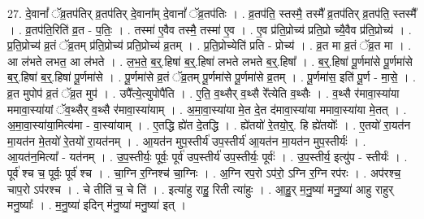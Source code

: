 \documentclass[17pt]{extarticle}
\begin{document}
27. दे॒वानां᳚ ॅव्र॒तप॑तिर् व्र॒तप॑तिर् दे॒वाना᳚म् दे॒वानां᳚ ॅव्र॒तप॑तिः । . व्र॒तप॑ति॒ स्तस्मै॒ तस्मै᳚ व्र॒तप॑तिर् व्र॒तप॑ति॒ स्तस्मै᳚ । . व्र॒तप॑ति॒रिति॑ व्र॒त - प॒तिः॒ । . तस्मा॑ ए॒वैव तस्मै॒ तस्मा॑ ए॒व । . ए॒व प्र॑ति॒प्रोच्य॑ प्रति॒प्रो च्यै॒वैव प्र॑ति॒प्रोच्य॑ । . प्र॒ति॒प्रोच्य॑ व्र॒तं ॅव्र॒तम् प्र॑ति॒प्रोच्य॑ प्रति॒प्रोच्य॑ व्र॒तम् । . प्र॒ति॒प्रोच्येति॑ प्रति - प्रोच्य॑ । . व्र॒त मा व्र॒तं ॅव्र॒त मा । . आ ल॑भते लभत॒ आ ल॑भते । . ल॒भ॒ते॒ ब॒र्॒.हिषा॑ ब॒र्॒.हिषा॑ लभते लभते ब॒र्॒.हिषा᳚ । . ब॒र्॒.हिषा॑ पू॒र्णमा॑से पू॒र्णमा॑से ब॒र्॒.हिषा॑ ब॒र्॒.हिषा॑ पू॒र्णमा॑से । . पू॒र्णमा॑से व्र॒तं ॅव्र॒तम् पू॒र्णमा॑से पू॒र्णमा॑से व्र॒तम् । . पू॒र्णमा॑स॒ इति॑ पू॒र्ण - मा॒से॒ । . व्र॒त मुपोप॑ व्र॒तं ॅव्र॒त मुप॑ । . उपै᳚त्ये॒त्युपोपै॑ति । . ए॒ति॒ व॒थ्सैर् व॒थ्सै रे᳚त्येति व॒थ्सैः । . व॒थ्सै र॑मावा॒स्या॑या ममावा॒स्या॑यां ॅव॒थ्सैर् व॒थ्सै र॑मावा॒स्या॑याम् । . अ॒मा॒वा॒स्या॑या मे॒त दे॒त द॑मावा॒स्या॑या ममावा॒स्या॑या मे॒तत् । . अ॒मा॒वा॒स्या॑या॒मित्य॑मा - वा॒स्या॑याम् । . ए॒तद्धि ह्ये॑त दे॒तद्धि । . ह्ये॑तयो॑ रे॒तयो॒र्॒. हि ह्ये॑तयोः᳚ । . ए॒तयो॑ रा॒यत॑न मा॒यत॑न मे॒तयो॑ रे॒तयो॑ रा॒यत॑नम् । . आ॒यत॑न मुप॒स्तीर्य॑ उप॒स्तीर्य॑ आ॒यत॑न मा॒यत॑न मुप॒स्तीर्यः॑ । . आ॒यत॑न॒मित्या᳚ - यत॑नम् । . उ॒प॒स्तीर्यः॒ पूर्वः॒ पूर्व॑ उप॒स्तीर्य॑ उप॒स्तीर्यः॒ पूर्वः॑ । . उ॒प॒स्तीर्य॒ इत्यु॑प - स्तीर्यः॑ । . पूर्व॑ श्च च॒ पूर्वः॒ पूर्व॑ श्च । . चा॒ग्नि र॒ग्निश्च॑ चा॒ग्निः । . अ॒ग्नि रप॒रो ऽप॑रो॒ ऽग्नि र॒ग्नि रप॑रः । . अप॑रश्च॒ चाप॒रो ऽप॑रश्च । . चे तीति॑ च॒ चे ति॑ । . इत्या॑हु राहु॒ रिती त्या॑हुः । . आ॒हु॒र् म॒नु॒ष्या॑ मनु॒ष्या॑ आहु राहुर् मनु॒ष्याः᳚ । . म॒नु॒ष्या॑ इदिन् म॑नु॒ष्या॑ मनु॒ष्या॑ इत् । \newline
\end{document}
